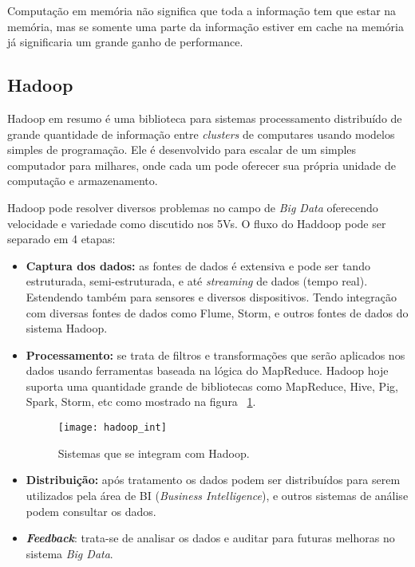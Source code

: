 Computação em memória não significa que toda a informação tem que estar na memória, mas se somente uma parte da informação estiver em cache na memória já significaria um grande ganho de performance.~\cite{realtime}

\subsection{Hadoop}
Hadoop em resumo é uma biblioteca para sistemas processamento distribuído de grande quantidade de informação entre \textit{clusters} de computares usando modelos simples de programação. Ele é desenvolvido para escalar de um simples computador para milhares, onde cada um pode oferecer sua própria unidade de computação e armazenamento.~\cite{hadoop}

Hadoop pode resolver diversos problemas no campo de \textit{Big Data} oferecendo velocidade e variedade como discutido nos 5Vs. O fluxo do Haddoop pode ser separado em 4 etapas:~\cite{hadoopessentials}

\begin{itemize}
\item \textbf{Captura dos dados:} as fontes de dados é extensiva e pode ser tando estruturada, semi-estruturada, e até \textit{streaming} de dados (tempo real). Estendendo também para sensores e diversos dispositivos. Tendo integração com diversas fontes de dados como Flume, Storm, e outros fontes de dados do sistema Hadoop.

\item \textbf{Processamento:} se trata de filtros e transformações que serão aplicados  nos dados usando ferramentas baseada na lógica do MapReduce. Hadoop hoje suporta uma quantidade grande de bibliotecas como MapReduce, Hive, Pig, Spark, Storm, etc como mostrado na figura ~\ref{fig:hadoopint}.
	
\begin{figure}[!h]
		\caption{\label{fig:hadoopint} Sistemas que se integram com Hadoop.}
		\begin{center}
			\texttt{[image: hadoop\_int]}
		\end{center}
\end{figure}

\item \textbf{Distribuição:} após tratamento os dados podem ser distribuídos para serem utilizados pela área de BI (\textit{Business Intelligence}), e outros sistemas de análise podem consultar os dados.
	
\item \textbf{\textit{Feedback}}: trata-se de analisar os dados e auditar para futuras melhoras no sistema \textit{Big Data}.
\end{itemize}

